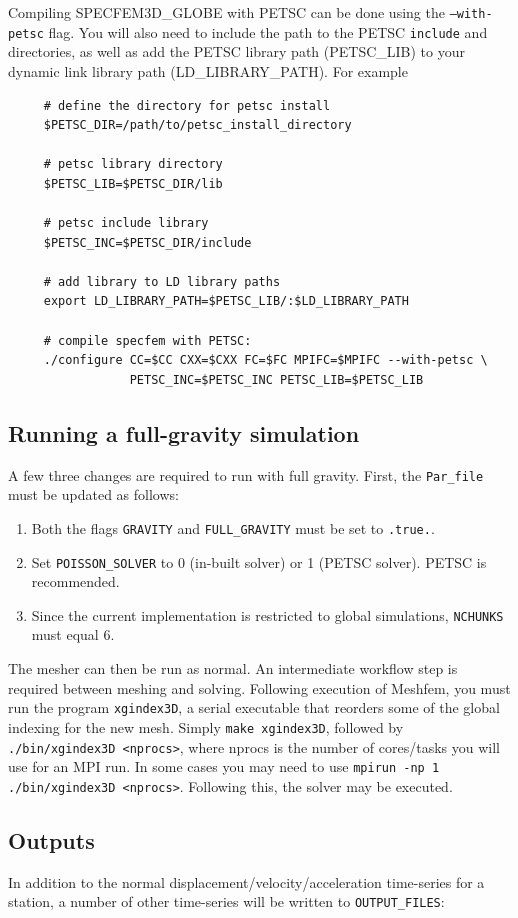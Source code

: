  Compiling SPECFEM3D\_GLOBE with PETSC can be done using the \texttt{--with-petsc} flag. You will also need to include the 
 path to the PETSC \texttt{include} and  directories, as well as add the PETSC library path (PETSC\_LIB) to your
 dynamic link library path (LD\_LIBRARY\_PATH). For example 
 \begin{verbatim}
     # define the directory for petsc install 
     $PETSC_DIR=/path/to/petsc_install_directory
 
     # petsc library directory
     $PETSC_LIB=$PETSC_DIR/lib
 
     # petsc include library 
     $PETSC_INC=$PETSC_DIR/include
 
     # add library to LD library paths 
     export LD_LIBRARY_PATH=$PETSC_LIB/:$LD_LIBRARY_PATH
 
     # compile specfem with PETSC: 
     ./configure CC=$CC CXX=$CXX FC=$FC MPIFC=$MPIFC --with-petsc \ 
                 PETSC_INC=$PETSC_INC PETSC_LIB=$PETSC_LIB
 \end{verbatim}
 
 
 \subsection{Running a full-gravity simulation}
 A few three changes are required to run with full gravity. First, the \texttt{Par\_file} must be updated as follows: 
 \begin{enumerate}
   \item Both the flags \texttt{GRAVITY} and \texttt{FULL\_GRAVITY} must be set to \texttt{.true.}.   
   \item Set \texttt{POISSON\_SOLVER} to 0 (in-built solver) or 1 (PETSC solver). PETSC is recommended. 
   \item Since the current implementation is restricted to global simulations, \texttt{NCHUNKS} must equal 6.
 \end{enumerate}    
The mesher can then be run as normal. An intermediate workflow step is required between meshing and solving. 
Following execution of Meshfem, you must run the program \texttt{xgindex3D}, a serial executable that reorders 
some of the global indexing for the new mesh. Simply \texttt{make xgindex3D}, followed by \texttt{./bin/xgindex3D <nprocs>}, 
where nprocs is the number of cores/tasks you will use for an MPI run. In some cases you may need to use  
\texttt{mpirun -np 1 ./bin/xgindex3D <nprocs>}. Following this, the solver may be executed.
 
 \subsection{Outputs}
 In addition to the normal displacement/velocity/acceleration time-series for a station, a number of other time-series 
 will be written to \texttt{OUTPUT\_FILES}: 
 
